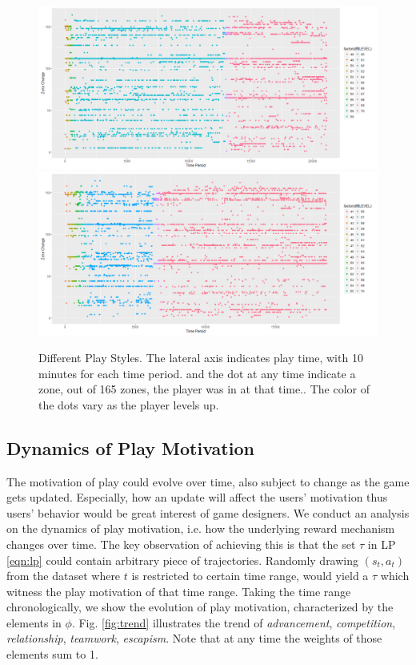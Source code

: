 \documentclass{sigchi}
\begin{document}
\begin{figure}[t]
    \centering
    \includegraphics[width=\textwidth]{figs/Rplot31.png}
    \includegraphics[width=\textwidth]{figs/Rplot36.png}
    \caption{Different Play Styles. The lateral axis indicates play time, with 10 minutes for each time period. and the dot at any time indicate a zone, out of 165 zones, the player was in at that time.. The color of the dots vary as the player levels up.}
    \label{fig:trajectory}
\end{figure}

\subsection{Dynamics of Play Motivation}

The motivation of play could evolve over time, also subject to change as the game gets updated.
Especially, how an update will affect the users' motivation thus users' behavior would be great interest of game designers.
We conduct an analysis on the dynamics of play motivation, i.e. how the underlying reward mechanism changes over time.
The key observation of achieving this is that the set $\tau$ in LP \eqref{eqn:lp} could contain arbitrary piece of trajectories.
Randomly drawing $(s_t,a_t)$ from the dataset where $t$ is restricted to certain time range, would yield a $\tau$ which witness the play motivation of that time range.
Taking the time range chronologically, we show the evolution of play motivation, characterized by the elements in $\phi$.
Fig. \ref{fig:trend} illustrates the trend of \textit{advancement}, \textit{competition}, \textit{relationship}, \textit{teamwork}, \textit{escapism}.
Note that at any time the weights of those elements sum to 1.
\end{document}
